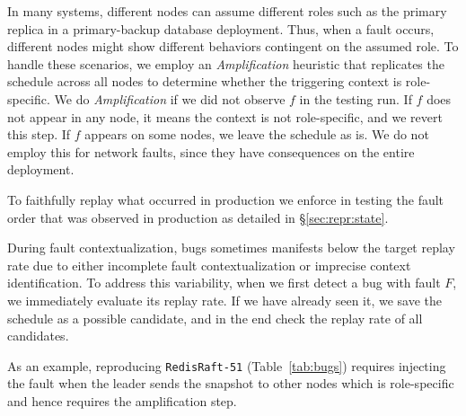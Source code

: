  In many systems, different nodes can assume different roles such as the primary replica in a primary-backup database deployment.
Thus, when a fault occurs, different nodes might show different behaviors contingent on the assumed role.
To handle these scenarios, we employ an \emph{Amplification} heuristic that replicates the schedule across all nodes to determine whether the triggering context is role-specific.
We do \emph{Amplification} if we did not observe $f$ in the testing run.
If $f$ does not appear in any node, it means the context is not role-specific, and we revert this step.
If $f$ appears on some nodes, we leave the schedule as is.
We do not employ this for network faults, since they have consequences on the entire deployment.


 To faithfully replay what occurred in production we enforce in testing the fault order that was observed in production as detailed in \S\ref{sec:repr:state}.

 During fault contextualization, bugs sometimes manifests below the target replay rate due to either incomplete fault contextualization or imprecise context identification.
To address this variability, when we first detect a bug with fault $F$, we immediately evaluate its replay rate.
If we have already seen it, we save the schedule as a possible candidate, and in the end check the replay rate of all candidates.

As an example, reproducing \texttt{RedisRaft-51} (Table~\ref{tab:bugs}) requires injecting the fault when the leader sends the snapshot to other nodes which is role-specific and hence requires the amplification step.


